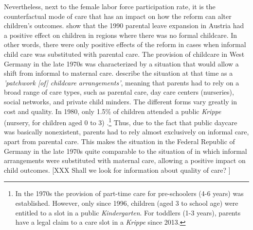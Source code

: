 \documentclass[11pt, a4paper]{article} %
\begin{document}
Nevertheless, next to the female labor force participation rate, it is the counterfactual mode of care that has an impact on how the reform can alter children's outcomes. \cite{danzer2017parental} show that the 1990 parental leave expansion in Austria had a positive effect on children in regions where there was no formal childcare. In other words, there were only positive effects of the reform in cases when informal child care was substituted with parental care. The provision of childcare in West Germany in the late 1970s was characterized by a situation that would allow a shift from informal to maternal care. \cite{hank2001childcare} describe the situation at that time as a \textit{'patchwork [of] childcare arrangements'}, meaning that parents had to rely on a broad range of care types, such as parental care, day care centers (nurseries), social networks, and private child minders. The different forms vary greatly in cost and quality. In 1980, only 1.5\% of children attended a public \textit{Krippe} (nursery, for children aged 0 to 3) \citep[p.~34]{bildungsbericht2006}.\footnote{In the 1970s the provision of part-time care for pre-schoolers (4-6 years) was established. However, only since 1996, children (aged 3 to school age) were entitled to a slot in a public \textit{Kindergarten}. For toddlers (1-3 years), parents have a legal claim to a care slot in a \textit{Krippe} since 2013.} Thus, due to the fact that public daycare was basically nonexistent, parents had to rely almost exclusively on informal care, apart from parental care. This makes the situation in the Federal Republic of Germany in the late 1970s quite comparable to the situation of \cite{danzer2017parental} in which informal arrangements were substituted with maternal care, allowing a positive impact on child outcomes.
[XXX Shall we look for information about quality of care? ]



\bigskip
\end{document}
